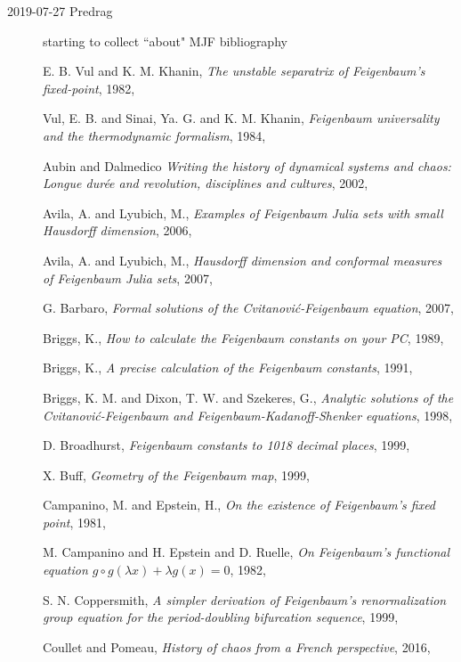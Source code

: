 \begin{description}
\item[2019-07-27 Predrag]
starting to collect ``about" MJF bibliography

{E. B. Vul and K. M. Khanin},
{\em The unstable separatrix of {Feigenbaum}'s fixed-point},
{1982},

{Vul, E. B. and Sinai, Ya. G. and K. M. Khanin},
{\em Feigenbaum universality and the thermodynamic formalism},
{1984},

Aubin and Dalmedico
{\em Writing the history of dynamical systems and chaos: {Longue}
dur{\'{e}}e and revolution, disciplines and cultures},
{2002},

{Avila, A. and Lyubich, M.},
  {\em Examples of {Feigenbaum Julia} sets with small {Hausdorff} dimension},
{2006},

{Avila, A. and Lyubich, M.},
  {\em Hausdorff dimension and conformal measures of {Feigenbaum Julia} sets},
{2007},

{G. Barbaro},
{\em Formal solutions of the {Cvitanovi{\'c}-Feigenbaum} equation},
{2007},

{Briggs, K.},
{\em How to calculate the {Feigenbaum} constants on your {PC}},
{1989},

{Briggs, K.},
{\em A precise calculation of the {Feigenbaum} constants},
{1991},

{Briggs, K. M. and Dixon, T. W. and Szekeres, G.},
{\em Analytic solutions of the {Cvitanovi{\'c}-Feigenbaum} and {Feigenbaum-Kadanoff-Shenker} equations},
{1998},

{D. Broadhurst},
{\em Feigenbaum constants to 1018 decimal places},
{1999},

{X. Buff},
{\em Geometry of the {Feigenbaum} map},
{1999},

{Campanino, M. and Epstein, H.},
{\em On the existence of {Feigenbaum's} fixed point},
{1981},

{M. Campanino and H. Epstein and D. Ruelle},
{\em On {Feigenbaum}'s functional equation {$g \circ g(\lambda x) + \lambda g(x) = 0$}},
{1982},

{S. N. Coppersmith},
{\em A simpler derivation of {Feigenbaum}'s renormalization group equation for the period-doubling bifurcation sequence},
{1999},

{Coullet and Pomeau},
{\em History of chaos from a {French} perspective},
{2016},


\end{description}
